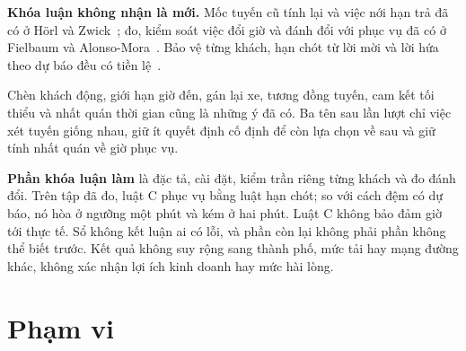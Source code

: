 \begin{khungy}
\textbf{Khóa luận không nhận là mới.} Mốc tuyến cũ tính lại và việc nới hạn trả đã có ở Hörl và
Zwick~\cite{horl2022}; đo, kiểm soát việc đổi giờ và đánh đổi với phục vụ đã có ở Fielbaum và
Alonso-Mora~\cite{fielbaum2020}. Bảo vệ từng khách, hạn chót từ lời mời và lời hứa theo dự báo đều có
tiền lệ~\cite{elmi2026,schulz2026,hu2022}.

Chèn khách động, giới hạn giờ đến, gán lại xe, tương đồng tuyến, cam kết tối thiểu và nhất quán thời gian
cũng là những ý đã có. Ba tên sau lần lượt chỉ việc xét tuyến giống nhau, giữ ít quyết định cố định
để còn lựa chọn về sau và giữ tính nhất quán về giờ phục vụ.

\textbf{Phần khóa luận làm} là đặc tả, cài đặt, kiểm trần riêng từng khách và đo đánh đổi. Trên tập đã đo,
luật C phục vụ bằng luật hạn chót; so với cách đệm có dự báo, nó hòa ở ngưỡng một phút và kém ở hai phút.
Luật C không bảo đảm giờ tới thực tế. Sổ không kết luận ai có lỗi, và phần còn lại không phải phần
không thể biết trước. Kết quả không suy rộng sang thành phố, mức tải hay mạng đường khác, không xác nhận
lợi ích kinh doanh hay mức hài lòng.
\end{khungy}

\section{Phạm vi}
\label{muc:c1-phamvi}

